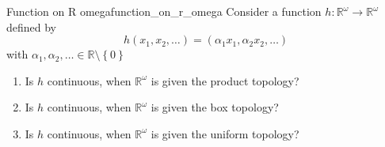 \begin{example}{Function on R omega}{function_on_r_omega}
    Consider a function $ h : \mathbb{R} ^{ \omega  }  \to \mathbb{R} ^{ \omega  }  $ defined by 
    \[
    h\left( x_{1} , x_{2} , \ldots \right) = \left( \alpha _{ 1 } x _{ 1 } , \alpha _{ 2 } x _{ 2 }, \ldots  \right)
    \]
    with $ \alpha _{ 1 } , \alpha _{ 2 } , \ldots  \in  \mathbb{R} \setminus \left\{ 0 \right\}  $ 
    \begin{enumerate}
        \item Is $ h $  continuous, when $ \mathbb{R} ^{ \omega  }  $  is given the product topology?

        \item Is $ h $  continuous, when $ \mathbb{R} ^{ \omega  }  $ is given the box topology?

        \item Is $ h $  continuous, when $ \mathbb{R} ^{ \omega  }  $ is given the uniform topology?
    \end{enumerate}
\end{example}
